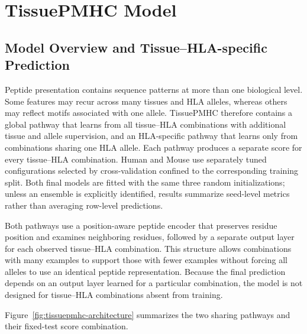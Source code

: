 \section{TissuePMHC Model}

\subsection{Model Overview and Tissue--HLA-specific Prediction}

Peptide presentation contains sequence patterns at more than one biological level. Some features may recur across many tissues and HLA alleles, whereas others may reflect motifs associated with one allele. TissuePMHC therefore contains a global pathway that learns from all tissue--HLA combinations with additional tissue and allele supervision, and an HLA-specific pathway that learns only from combinations sharing one HLA allele. Each pathway produces a separate score for every tissue--HLA combination. Human and Mouse use separately tuned configurations selected by cross-validation confined to the corresponding training split. Both final models are fitted with the same three random initializations; unless an ensemble is explicitly identified, results summarize seed-level metrics rather than averaging row-level predictions.

Both pathways use a position-aware peptide encoder that preserves residue position and examines neighboring residues, followed by a separate output layer for each observed tissue--HLA combination. This structure allows combinations with many examples to support those with fewer examples without forcing all alleles to use an identical peptide representation. Because the final prediction depends on an output layer learned for a particular combination, the model is not designed for tissue--HLA combinations absent from training.

Figure~\ref{fig:tissuepmhc-architecture} summarizes the two sharing pathways and their fixed-test score combination.

